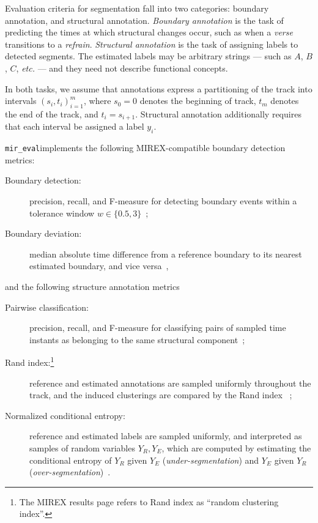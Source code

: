 \documentclass{article}
\def\etc{\emph{etc.}}
\def\mireval{\texttt{mir\_eval}}
\begin{document}
Evaluation criteria for segmentation fall into two categories: boundary annotation, and structural annotation.
\emph{Boundary annotation} is the task of predicting the times at which structural changes occur, such as when a \emph{verse} transitions to a \emph{refrain}.
\emph{Structural annotation} is the task of assigning labels to detected segments.  
The estimated labels may be arbitrary strings --- such as $A$, $B$, $C$, \etc{} --- and they need not describe functional concepts.

In both tasks, we assume that annotations express a partitioning of the track 
into intervals ${(s_i, t_i)}_{i=1}^m$, where $s_0=0$ denotes the beginning of track, 
$t_m$ denotes the end of the track, and $t_i = s_{i+1}$.
Structural annotation additionally requires that each interval be assigned a label $y_i$.

\mireval implements the following MIREX-compatible boundary detection metrics:
\begin{description}
\item[Boundary detection:] precision, recall, and F-measure for detecting boundary
events within a tolerance window $w\in \{0.5, 3\}$~\cite{turnbull2007supervised};
\item[Boundary deviation:] median absolute time difference from a reference boundary
to its nearest estimated boundary, and vice versa~\cite{turnbull2007supervised},
\end{description}
and the following structure annotation metrics
\begin{description}
\item[Pairwise classification:] precision, recall, and F-measure for classifying pairs
of sampled time instants as belonging to the same structural
component~\cite{levy2008structural};
\item[Rand index:\footnote{The MIREX results page refers to Rand index as ``random
clustering index''.}] reference and estimated annotations are sampled uniformly
throughout the track, and the induced clusterings are compared by the Rand index
~\cite{rand1971objective};
\item[Normalized conditional entropy:] reference and estimated labels are sampled
uniformly, and interpreted as samples of random variables $Y_R, Y_E$, which are
computed by estimating the conditional entropy of $Y_R$ given $Y_E$
(\emph{under-segmentation}) and $Y_E$ given $Y_R$ 
(\emph{over-segmentation})~\cite{lukashevich2008towards}.
\end{description}
\end{document}
